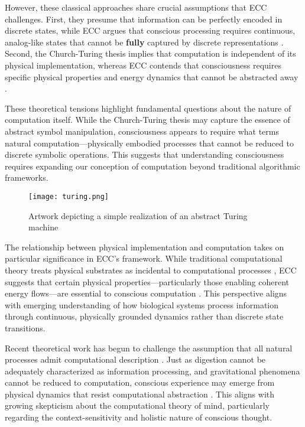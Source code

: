\begin{refsection}
However, these classical approaches share crucial assumptions that ECC challenges. First, they presume that information can be perfectly encoded in discrete states, while ECC argues that conscious processing requires continuous, analog-like states that cannot be \textbf{fully} captured by discrete representations \cite{vanGelder1995}. Second, the Church-Turing thesis implies that computation is independent of its physical implementation, whereas ECC contends that consciousness requires specific physical properties and energy dynamics that cannot be abstracted away \cite{Landauer1996}.

These theoretical tensions highlight fundamental questions about the nature of computation itself. While the Church-Turing thesis may capture the essence of abstract symbol manipulation, consciousness appears to require what \cite{Piccinini2015} terms natural computation—physically embodied processes that cannot be reduced to discrete symbolic operations. This suggests that understanding consciousness requires expanding our conception of computation beyond traditional algorithmic frameworks.

\begin{figure}[h]
    \centering
    \texttt{[image: turing.png]}

    \caption{Artwork depicting a simple realization of an abstract Turing machine}
\end{figure}

The relationship between physical implementation and computation takes on particular significance in ECC's framework. While traditional computational theory treats physical substrates as incidental to computational processes \cite{Chalmers2011}, ECC suggests that certain physical properties—particularly those enabling coherent energy flows—are essential to conscious computation \cite{Landauer1996}. This perspective aligns with emerging understanding of how biological systems process information through continuous, physically grounded dynamics rather than discrete state transitions.

Recent theoretical work has begun to challenge the assumption that all natural processes admit computational description \cite{Searle1990}. Just as digestion cannot be adequately characterized as information processing, and gravitational phenomena cannot be reduced to computation, conscious experience may emerge from physical dynamics that resist computational abstraction \cite{vanGelder1995}. This aligns with growing skepticism about the computational theory of mind, particularly regarding the context-sensitivity and holistic nature of conscious thought.


\end{refsection}
